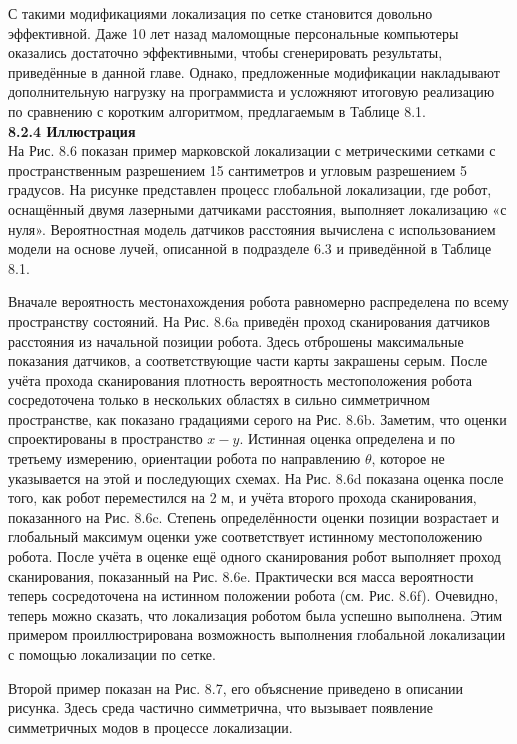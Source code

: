 \documentclass[10pt,a4paper]{article}
\begin{document}
С такими модификациями локализация по сетке становится довольно эффективной. Даже 10 лет назад маломощные персональные компьютеры оказались достаточно эффективными, чтобы сгенерировать результаты, приведённые в данной главе. Однако, предложенные модификации накладывают дополнительную нагрузку на программиста и усложняют итоговую реализацию по сравнению с коротким алгоритмом, предлагаемым в Таблице 8.1.\\

\textbf{8.2.4	Иллюстрация}\\

На Рис. 8.6 показан пример марковской локализации с метрическими сетками с пространственным разрешением 15 сантиметров и угловым разрешением 5 градусов. На рисунке представлен процесс глобальной локализации, где робот, оснащённый двумя лазерными датчиками расстояния, выполняет локализацию «с нуля». Вероятностная модель датчиков расстояния вычислена с использованием модели на основе лучей, описанной в подразделе 6.3 и приведённой в Таблице 8.1.

Вначале вероятность местонахождения робота равномерно распределена по всему пространству состояний. На Рис. 8.6a приведён проход сканирования датчиков расстояния из начальной позиции робота. Здесь отброшены максимальные показания датчиков, а соответствующие части карты закрашены серым. После учёта прохода сканирования плотность вероятность местоположения робота сосредоточена только в нескольких областях в сильно симметричном пространстве, как показано градациями серого на Рис. 8.6b. Заметим, что оценки спроектированы в пространство $x-y$. Истинная оценка определена и по третьему измерению, ориентации робота по направлению $\theta$, которое не указывается на этой и последующих схемах. На Рис. 8.6d показана оценка после того, как робот переместился на 2 м, и учёта второго прохода сканирования, показанного на Рис. 8.6c. Степень определённости оценки позиции возрастает и глобальный максимум оценки уже соответствует истинному местоположению робота. После учёта в оценке ещё одного сканирования робот выполняет проход сканирования, показанный на Рис. 8.6e. Практически вся масса вероятности теперь сосредоточена на истинном положении робота (см. Рис. 8.6f). Очевидно, теперь можно сказать, что локализация роботом была успешно выполнена. Этим примером проиллюстрирована возможность выполнения глобальной локализации с помощью локализации по сетке.

Второй пример показан на Рис. 8.7, его объяснение приведено в описании рисунка. Здесь среда частично симметрична, что вызывает появление симметричных модов в процессе локализации. 
\end{document}
